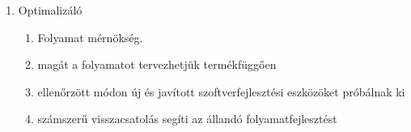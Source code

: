 \begin{enumerate}
	\item Optimalizáló
		\begin{enumerate}
			\item Folyamat mérnökség.
			\item magát a folyamatot tervezhetjük termékfüggően
			\item ellenőrzött módon új és javított szoftverfejlesztési eszközöket próbálnak ki
			\item számszerű visszacsatolás segíti az állandó folyamatfejlesztést
		\end{enumerate}

\end{enumerate}
